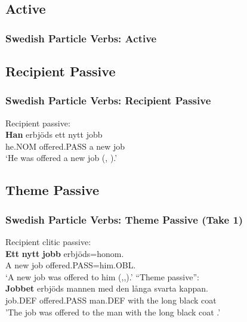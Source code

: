 \documentclass{beamer}
\begin{document}
\subsection{Active}
\begin{frame}
	\frametitle{Swedish Particle Verbs: Active}
	\begin{exe}
\end{exe}
\end{frame}
\subsection{Recipient Passive}
\begin{frame}
	\frametitle{Swedish Particle Verbs: Recipient Passive}
\begin{exe}
		\ex Recipient passive:\\
		\gll \textbf{Han} erbjöds ett nytt jobb\\
			he.NOM offered.PASS a new job\\
			\trans `He was offered a new job (\citealt{Anward.1989}, \citealt{Lundquist.2006}).'
\end{exe}
\end{frame}

\subsection{Theme Passive}
\begin{frame}
	\frametitle{Swedish Particle Verbs: Theme Passive (Take 1)}
	\begin{exe}
	\ex Recipient clitic passive:\\
	\gll \textbf{Ett} \textbf{nytt} \textbf{jobb} erbjöds=honom.\\
		A new job offered.PASS=him.OBL.\\
		\trans `A new job was offered to him (\citealt{Anward.1989},\citealt{Falk.1990},\citealt{Lundquist.2006}).'
	\ex ``Theme passive'': \\
	\gll \textbf{Jobbet} erbjöds mannen med den långa svarta kappan.\\
		job.DEF offered.PASS man.DEF with the long black coat\\
		'The job was offered to the man with the long black coat \citep[ex 26]{Lundquist.2004}.'
\end{exe}
\end{frame}
\end{document}
